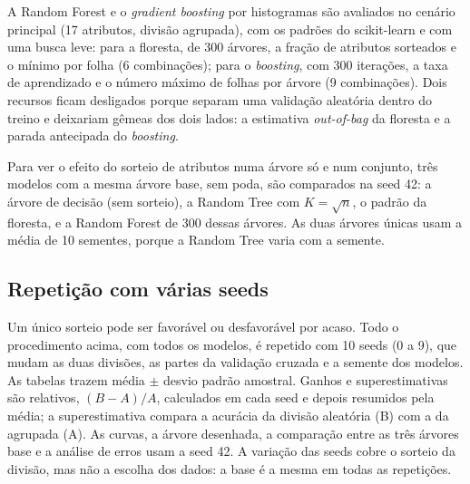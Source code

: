 A Random Forest e o \emph{gradient boosting} por histogramas são avaliados no cenário principal (17 atributos, divisão agrupada), com os padrões do scikit-learn e com uma busca leve: para a floresta, de 300 árvores, a fração de atributos sorteados e o mínimo por folha (6 combinações); para o \emph{boosting}, com 300 iterações, a taxa de aprendizado e o número máximo de folhas por árvore (9 combinações). Dois recursos ficam desligados porque separam uma validação aleatória dentro do treino e deixariam gêmeas dos dois lados: a estimativa \emph{out-of-bag} da floresta e a parada antecipada do \emph{boosting}.

Para ver o efeito do sorteio de atributos numa árvore só e num conjunto, três modelos com a mesma árvore base, sem poda, são comparados na seed 42: a árvore de decisão (sem sorteio), a Random Tree com $K = \sqrt{n}$, o padrão da floresta, e a Random Forest de 300 dessas árvores. As duas árvores únicas usam a média de 10 sementes, porque a Random Tree varia com a semente.

\subsection{Repetição com várias seeds}\label{sec:seeds}

Um único sorteio pode ser favorável ou desfavorável por acaso. Todo o procedimento acima, com todos os modelos, é repetido com 10 seeds (0 a 9), que mudam as duas divisões, as partes da validação cruzada e a semente dos modelos. As tabelas trazem média $\pm$ desvio padrão amostral. Ganhos e superestimativas são relativos, $(B - A)/A$, calculados em cada seed e depois resumidos pela média; a superestimativa compara a acurácia da divisão aleatória (B) com a da agrupada (A). As curvas, a árvore desenhada, a comparação entre as três árvores base e a análise de erros usam a seed 42. A variação das seeds cobre o sorteio da divisão, mas não a escolha dos dados: a base é a mesma em todas as repetições.
